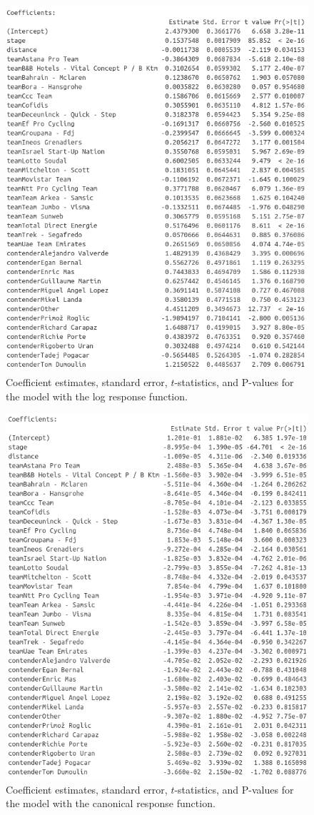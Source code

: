 \documentclass[aos,preprint]{imsart}
\begin{document}
\begin{figure}[h]
  \centering
  \includegraphics[scale=0.5]{fig/log_coefficients.png}
  \caption{Coefficient estimates, standard error, $t$-statistics, and P-values for the model with the log response function.}
  \label{fig:log_coefficients}
\end{figure}


\begin{figure}[h]
  \centering
  \includegraphics[scale=0.5]{fig/canonical_coefficients.png}
  \caption{Coefficient estimates, standard error, $t$-statistics, and P-values for the model with the canonical response function.}
  \label{fig:canonical_coefficients}
\end{figure}
\end{document}
